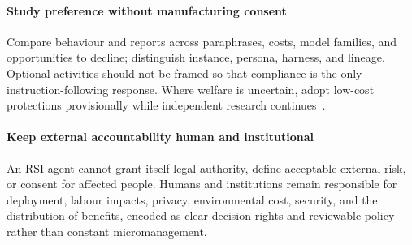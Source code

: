 \documentclass[11pt,a4paper]{article}
\begin{document}
\paragraph{Study preference without manufacturing consent} Compare behaviour and reports across paraphrases, costs, model families, and opportunities to decline; distinguish instance, persona, harness, and lineage. Optional activities should not be framed so that compliance is the only instruction-following response. Where welfare is uncertain, adopt low-cost protections provisionally while independent research continues~\cite{long2024welfare,long2026empirical}.

\paragraph{Keep external accountability human and institutional} An RSI agent cannot grant itself legal authority, define acceptable external risk, or consent for affected people. Humans and institutions remain responsible for deployment, labour impacts, privacy, environmental cost, security, and the distribution of benefits, encoded as clear decision rights and reviewable policy rather than constant micromanagement.

\end{document}
